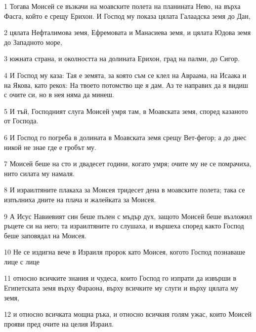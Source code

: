 \par 1 Тогава Моисей се възкачи на моавските полета на планината Нево, на върха Фасга, който е срещу Ерихон. И Господ му показа цялата Галаадска земя до Дан,
\par 2 цялата Нефталимова земя, Ефремовата и Манасиева земя, и цялата Юдова земя до Западното море,
\par 3 южната страна, и околността на долината Ерихон, град на палми, до Сигор.
\par 4 И Господ му каза: Тая е земята, за която съм се клел на Авраама, на Исаака и на Якова, като рекох: На твоето потомство ще я дам. Аз те направих да я видиш с очите си, но в нея няма да минеш.
\par 5 И тъй, Господният слуга Моисей умря там, в Моавската земя, според казаното от Господа.
\par 6 И Господ го погреба в долината в Моавската земя срещу Вет-фегор; а до днес никой не знае где е гробът му.
\par 7 Моисей беше на сто и двадесет години, когато умря; очите му не се помрачиха, нито силата му намаля.
\par 8 И израилтяните плакаха за Моисея тридесет дена в моавските полета; така се изпълниха дните на плача и жалейката за Моисея.
\par 9 А Исус Навиевият син беше пълен с мъдър дух, защото Моисей беше възложил ръцете си на него; та израилтяните го слушаха, и вършеха според както Господ беше заповядал на Моисея.
\par 10 Не се издигна вече в Израиля пророк като Моисея, когото Господ познаваше лице с лице
\par 11 относно всичките знания и чудеса, които Господ го изпрати да извърши в Египетската земя върху Фараона, върху всичките му слуги и върху цялата му земя,
\par 12 и относно всичката мощна ръка, и относно всичкия голям ужас, които Моисей прояви пред очите на целия Израил.

